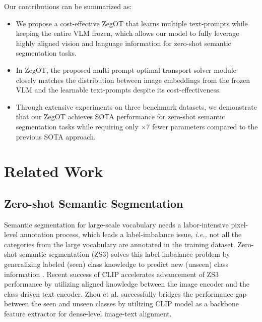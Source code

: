 \documentclass[nohyperref]{article}
\theoremstyle{plain}
\theoremstyle{definition}
\theoremstyle{remark}
\begin{document}
Our contributions can be summarized as:
\begin{itemize}
\item We propose a cost-effective ZegOT that learns multiple text-prompts while keeping the entire VLM frozen, which allows our model to fully leverage highly aligned vision and language information for zero-shot semantic segmentation tasks.
\item %
In ZegOT,
the proposed multi prompt optimal transport solver module
 closely matches the distribution between image embeddings from the frozen VLM and the learnable text-prompts despite its cost-effectiveness.
\item {Through extensive experiments on three benchmark datasets, we demonstrate that our ZegOT achieves SOTA performance for zero-shot semantic segmentation tasks while requiring only $\times$7 fewer parameters compared to the previous SOTA approach.}
\end{itemize}







\section{Related Work}

\subsection{Zero-shot Semantic Segmentation}

Semantic segmentation for large-scale vocabulary needs a labor-intensive pixel-level annotation process, which leads a label-imbalance issue, \textit{i.e.,} not all the categories from the large vocabulary are annotated in the training dataset.
Zero-shot semantic segmentation (ZS3) solves this label-imbalance problem by generalizing labeled (seen) class knowledge to predict new (unseen) class information \cite{bucher2019zero}. 
Recent success of CLIP \cite{radford2021clip} accelerates advancement of ZS3 performance by utilizing aligned knowledge between the image encoder and the class-driven text encoder. Zhou et al. \cite{zhou2022zegclip} successfully bridges the performance gap between the seen and unseen classes by utilizing CLIP model as a backbone feature extractor for dense-level image-text alignment.
\end{document}
